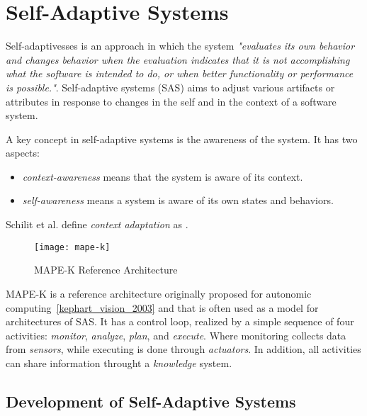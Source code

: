 \section{Self-Adaptive Systems}

Self-adaptivesses is an approach in which the system
\emph{"evaluates its own behavior and changes behavior when the evaluation indicates that it is not accomplishing what the software is intended to do, or when better functionality or performance is possible."}\cite{laddaga_self_1997}.
Self-adaptive systems (SAS) aims to adjust various artifacts or attributes in response to changes in the self and in the context of a software system\cite{salehie_self-adaptive_2009}.

A key concept in self-adaptive systems is the awareness of the system. It has two aspects\cite{salehie_self-adaptive_2009}:
\begin{itemize}
   \item \emph{context-awareness} means that the system is aware of its context.
   \item \emph{self-awareness} means a system is aware of its own states and behaviors.
\end{itemize}

Schilit et al.\cite{klein_survey_2008} define \emph{context adaptation} as .

\begin{figure}[!htb]
 \centering
 \texttt{[image: mape-k]}
 \caption{MAPE-K Reference Architecture}
\label{fig:mape-k}
\end{figure}

MAPE-K is a reference architecture originally proposed for autonomic computing~\ref{kephart_vision_2003} and that is often used as a model for architectures of SAS. It has a control loop, realized by a simple sequence of four activities: \emph{monitor}, \emph{analyze}, \emph{plan}, and \emph{execute}. Where monitoring collects data from \emph{sensors}, while executing is done through \emph{actuators}. In addition, all activities can share information throught a \emph{knowledge} system.

\subsection{Development of Self-Adaptive Systems}

